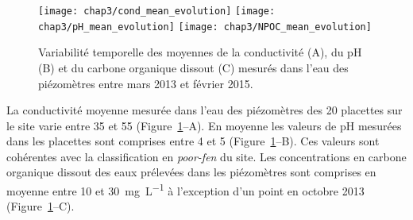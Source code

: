 \begin{figure}
\centering
\texttt{[image: chap3/cond\_mean\_evolution]}
\texttt{[image: chap3/pH\_mean\_evolution]}
\texttt{[image: chap3/NPOC\_mean\_evolution]}
\caption{Variabilité temporelle des moyennes de la conductivité (A), du pH (B) et du carbone organique dissout (C) mesurés dans l'eau des piézomètres entre mars 2013 et février 2015.}
\label{fig:wtr_phychim}
\end{figure}



%

La conductivité moyenne mesurée dans l'eau des piézomètres des 20 placettes sur le site varie entre \num{35} et \SI{55}{\usml} (Figure~\ref{fig:wtr_phychim}--A).
En moyenne les valeurs de pH mesurées dans les placettes sont comprises entre 4 et 5 (Figure~\ref{fig:wtr_phychim}--B).
Ces valeurs sont cohérentes avec la classification en \textit{poor-fen} du site.
Les concentrations en carbone organique dissout des eaux prélevées dans les piézomètres sont comprises en moyenne entre \num{10} et \SI{30}{\milli\gram\per\liter} à l'exception d'un point en octobre 2013 (Figure~\ref{fig:wtr_phychim}--C).






